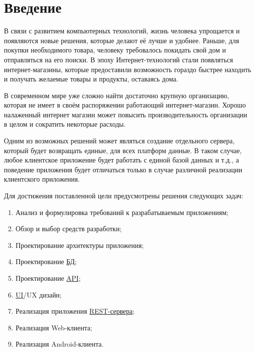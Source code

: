 \label{sec:intro}
\section*{Введение}\indent

В связи с развитием компьютерных технологий, жизнь человека упрощается и появляются новые решения, которые делают её лучше и удобнее. 
Раньше, для покупки необходимого товара, человеку требовалось покидать свой дом и отправляться на его поиски.
В эпоху Интернет-технологий стали появляться интернет-магазины, которые предоставили возможность гораздо быстрее находить и получать желаемые товары и продукты, оставаясь дома.

В современном мире уже сложно найти достаточно крупную организацию, которая не имеет в своём распоряжении работающий интернет-магазин.
Хорошо налаженный интернет магазин может повысить производительность организации в целом и сократить некоторые расходы.

Одним из возможных решений может являться создание отдельного сервера, который будет возвращать единые, для всех платформ данные. 
В таком случае, любое клиентское приложение будет работать с единой базой данных и т.д., а поведение приложения будет отличаться только в случае различной реализации клиентского приложения.

Для достижения поставленной цели предусмотрены решения следующих задач:
\begin{enumerate}
    \item Анализ и формулировка требований к разрабатываемым приложениям;
    \item Обзор и выбор средств разработки;
    \item Проектирование архитектуры приложения;
    \item Проектирование \hyperlink{gloss:db}{БД};
    \item Проектирование \hyperlink{gloss:api}{API};
    \item \hyperlink{gloss:ui}{UI}/UX дизайн;
    \item Реализация приложения \hyperlink{gloss:rest}{REST-сервера};
    \item Реализация Web-клиента;
    \item Реализация Android-клиента.
\end{enumerate}